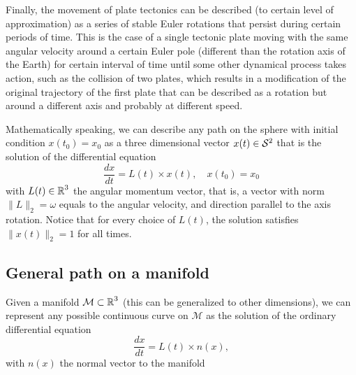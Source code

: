 Finally, the movement of plate tectonics can be described (to certain level of approximation) as a series of stable Euler rotations that persist during certain periods of time.
This is the case of a single tectonic plate moving with the same angular velocity around a certain Euler pole (different than the rotation axis of the Earth) for certain interval of time until some other dynamical process takes action, such as the collision of two plates, which results in a modification of the original trajectory of the first plate that can be described as a rotation but around a different axis and probably at different speed. 

Mathematically speaking, we can describe any path on the sphere with initial condition $x(t_0)=x_0$ as a three dimensional vector $x(t) \in \S2$ that is the solution of the differential equation 
\begin{equation}
    \frac{dx}{dt} = L(t) \times x(t),
    \quad 
    x(t_0) = x_0
\end{equation}
with $L(t) \in \operatorname{\mathbb{R}}^3$ the angular momentum vector, that is, a vector with norm $\| L \|_2 = \omega$ equals to the angular velocity, and direction parallel to the axis rotation. 
Notice that for every choice of $L(t)$, the solution satisfies $\| x(t) \|_2 = 1$ for all times.

\subsection{General path on a manifold}

Given a manifold $\mathcal M \subset \operatorname{\mathbb{R}}^3$ (this can be generalized to other dimensions), we can represent any possible continuous curve on $\mathcal M$ as the solution of the ordinary differential equation
\begin{equation}
    \frac{dx}{dt}
    = 
    L(t) \times n(x),
\end{equation} 
with $n(x)$ the normal vector to the manifold 